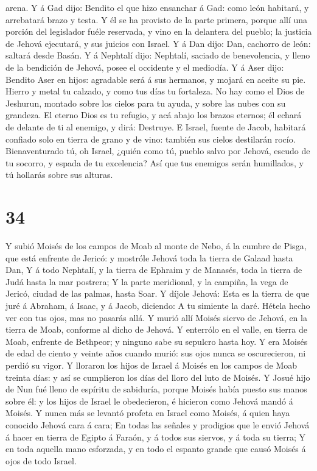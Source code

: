 arena.  Y á Gad dijo: Bendito el que hizo ensanchar á
Gad: como león habitará, y arrebatará brazo y testa.  Y
él se ha provisto de la parte primera, porque allí una porción del
legislador fuéle reservada, y vino en la delantera del pueblo; la
justicia de Jehová ejecutará, y sus juicios con Israel. 
Y á Dan dijo: Dan, cachorro de león: saltará desde Basán.
 Y á Nephtalí dijo: Nephtalí, saciado de benevolencia, y
lleno de la bendición de Jehová, posee el occidente y el mediodía.
 Y á Aser dijo: Bendito Aser en hijos: agradable será á
sus hermanos, y mojará en aceite su pie.  Hierro y metal
tu calzado, y como tus días tu fortaleza.  No hay como el
Dios de Jeshurun, montado sobre los cielos para tu ayuda, y sobre las
nubes con su grandeza.  El eterno Dios es tu refugio, y
acá abajo los brazos eternos; él echará de delante de ti al enemigo, y
dirá: Destruye.  E Israel, fuente de Jacob, habitará
confiado solo en tierra de grano y de vino: también sus cielos
destilarán rocío.  Bienaventurado tú, oh Israel, ¿quién
como tú, pueblo salvo por Jehová, escudo de tu socorro, y espada de tu
excelencia? Así que tus enemigos serán humillados, y tú hollarás sobre
sus alturas.

\hypertarget{section-33}{%
\section{34}\label{section-33}}

 Y subió Moisés de los campos de Moab al monte de Nebo, á
la cumbre de Pisga, que está enfrente de Jericó: y mostróle Jehová toda
la tierra de Galaad hasta Dan,  Y á todo Nephtalí, y la
tierra de Ephraim y de Manasés, toda la tierra de Judá hasta la mar
postrera;  Y la parte meridional, y la campiña, la vega de
Jericó, ciudad de las palmas, hasta Soar.  Y díjole
Jehová: Esta es la tierra de que juré á Abraham, á Isaac, y á Jacob,
diciendo: A tu simiente la daré. Hétela hecho ver con tus ojos, mas no
pasarás allá.  Y murió allí Moisés siervo de Jehová, en la
tierra de Moab, conforme al dicho de Jehová.  Y enterrólo
en el valle, en tierra de Moab, enfrente de Bethpeor; y ninguno sabe su
sepulcro hasta hoy.  Y era Moisés de edad de ciento y
veinte años cuando murió: sus ojos nunca se oscurecieron, ni perdió su
vigor.  Y lloraron los hijos de Israel á Moisés en los
campos de Moab treinta días: y así se cumplieron los días del lloro del
luto de Moisés.  Y Josué hijo de Nun fué lleno de espíritu
de sabiduría, porque Moisés había puesto sus manos sobre él: y los hijos
de Israel le obedecieron, é hicieron como Jehová mandó á Moisés.
 Y nunca más se levantó profeta en Israel como Moisés, á
quien haya conocido Jehová cara á cara;  En todas las
señales y prodigios que le envió Jehová á hacer en tierra de Egipto á
Faraón, y á todos sus siervos, y á toda su tierra;  Y en
toda aquella mano esforzada, y en todo el espanto grande que causó
Moisés á ojos de todo Israel.
